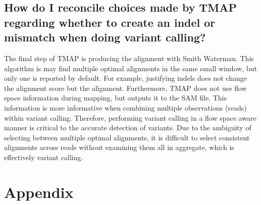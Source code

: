 \documentclass[a4paper,12pt]{book}
\begin{document}
\section{How do I reconcile choices made by TMAP regarding whether to create an indel or mismatch when doing variant calling?}

The final step of TMAP is producing the alignment with Smith Waterman.
This algorithm is may find multiple optimal alignments in the same small window, but only one is reported by default.
For example, justifying indels does not change the alignment score but the alignment. 
Furthermore, TMAP does not use flow space information during mapping, but outputs it to the SAM file.  
This information is more informative when combining multiple observations (reads) within variant calling.
Therefore, performing variant calling in a flow space aware manner is critical to the accurate detection of variants. 
Due to the ambiguity of selecting between multiple optimal alignments, it is difficult to select consistent alignments across reads without examining them all in aggregate, which is effectively variant calling.

\chapter{Appendix}

{}


\end{document}
